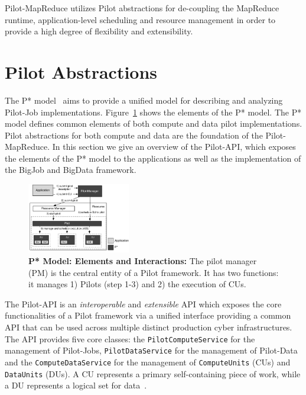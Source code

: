 \documentclass{sig-alternate}
\newcommand{\jhanote}[1]{ {\textcolor{red} { ***SJ: #1 }}}
\newcommand{\alnote}[1]{ {\textcolor{blue} { ***andreL: #1 }}}
\newcommand{\alnote}[1]{}
\newcommand{\jhanote}[1]{}
\newcommand{\upp}{\vspace*{-0.5em}}
\newcommand{\pilot}{Pilot\xspace}
\newcommand{\pilotjob}{Pilot-Job\xspace}
\newcommand{\pilotmapreduce}{Pilot-MapReduce\xspace}
\newcommand{\cus}{CUs\xspace}
\begin{document}
\pilotmapreduce utilizes \pilot abstractions for de-coupling the
MapReduce runtime, application-level scheduling and resource
management in order to provide a high degree of flexibility and
extensibility.






\upp
\section{Pilot Abstractions}
\label{sec-pilot-impl}


The P* model~\cite{pstar-2012} aims to provide a unified model for describing
and analyzing \pilotjob implementations. Figure~\ref{fig:figures_pstar} shows
the elements of the P* model. The P* model defines common elements of both
compute and data pilot implementations. Pilot abstractions for both compute and
data are the foundation of the \pilotmapreduce. In this section we give an
overview of the Pilot-API, which exposes the elements of the P* model to the
applications as well as the implementation of the BigJob and BigData framework.


\begin{figure}[t]
	\upp\upp
    \centering
    \includegraphics[width=0.4\textwidth]{figures/pstar_model_single.pdf}
    \caption{ \textbf{P* Model: Elements and
        Interactions:} The pilot manager (PM) is the central entity of a \pilot 
     framework. It has two functions: it manages 1) Pilots (step 1-3) and 2) the 
     execution of \cus.}
	\upp\upp
    \label{fig:figures_pstar}
\end{figure}


The Pilot-API is an {\it interoperable} and {\it extensible} API which
exposes the core functionalities of a \pilot framework via a unified
interface providing a common API that can be used across multiple
distinct production cyber infrastructures.  The API provides five
core classes: the \texttt{PilotComputeService} for the management of
Pilot-Jobs, \texttt{PilotDataService} for the management of Pilot-Data
and the \texttt{ComputeDataService} for the management of
\texttt{ComputeUnits} (CUs) and \texttt{DataUnits} (DUs). 
A CU represents a primary self-containing piece of work, while a DU
represents a logical set for data~\cite{pstar-2012}.
\end{document}
